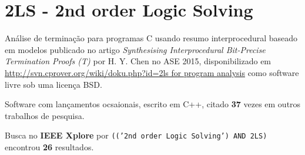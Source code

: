 

\label{softwares-summary}

\section{2LS - 2nd order Logic Solving}

Análise de terminação para programas C usando resumo interprocedural baseado em modelos
publicado no artigo {\it Synthesising Interprocedural Bit-Precise Termination Proofs (T)}
por H. Y. Chen
no ASE 2015,
disponibilizado em \url{http://svn.cprover.org/wiki/doku.php?id=2ls for program analysis}
como software livre
sob uma licença BSD.

Software com lançamentos ocsaionais,
escrito em C++,
citado {\bf 37} vezes em outros trabalhos de pesquisa.

Busca no {\bf IEEE Xplore} por
\texttt{(('2nd order Logic Solving') AND 2LS)}
encontrou {\bf 26}
resultados.

